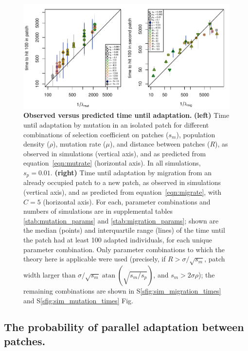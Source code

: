 \documentclass[10pt,letterpaper]{article}
\DeclareMathOperator{\atan}{atan}
\begin{document}
\begin{figure}[ht!]
  \begin{center}
      \includegraphics{times-predicted-observed}
  \end{center}
  \caption{
      \textbf{Observed versus predicted time until adaptation.}
      \textbf{(left)} 
      Time until adaptation by mutation in an isolated patch for different combinations
      of selection coefficient on patches ($s_m$), 
      population density ($\rho$),
      mutation rate ($\mu$),
      and distance between patches ($R$),
      as observed in simulations (vertical axis),
      and as predicted from equation~\eqref{eqn:mutrate} (horizontal axis).
      In all simulations, $s_p=0.01$.
      \textbf{(right)} 
      Time until adaptation by migration from an already occupied patch to a new patch,
      as observed in simulations (vertical axis),
      and as predicted from equation~\eqref{eqn:migrate}, with $C=5$ (horizontal axis).
      For each,
      parameter combinations and numbers of simulations are in supplemental tables \ref{stab:mutation_params} and \ref{stab:migration_params};
      shown are the median (points) and interquartile range (lines)
      of the time until the patch had at least 100 adapted individuals,
      for each unique parameter combination.
      Only parameter combinations to which the theory here is applicable were used
      (precisely, if
      $R > \sigma/\sqrt{s_m}$, 
      patch width larger than $\sigma/\sqrt{s_m} \atan(\sqrt{s_m/s_p})$, 
      and $s_m > 2 \sigma \rho$);
      the remaining combinations are shown in 
      S\ref{sfig:sim_migration_times} and S\ref{sfig:sim_mutation_times} Fig.
  }   \label{fig:sim_times}
\end{figure}




\subsection[Probability of Parallel Adaptation]{The probability of parallel adaptation between patches.} 
\label{ss:probparallel}
\end{document}
